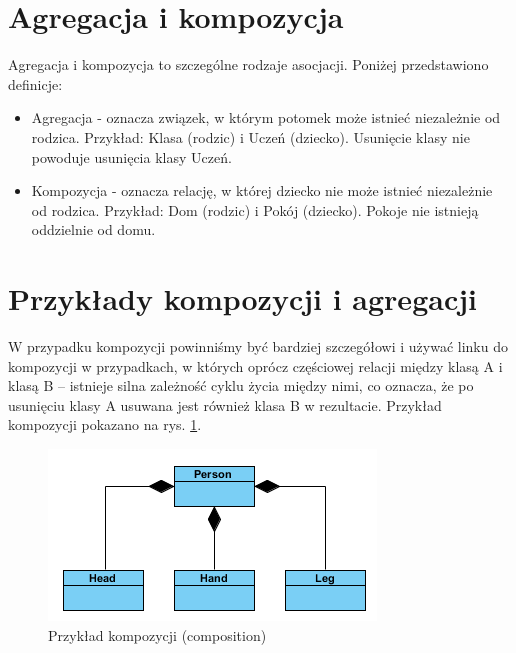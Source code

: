 \documentclass[a4paper,11pt]{report}
\begin{document}
\section{Agregacja i kompozycja}
Agregacja i kompozycja to szczególne rodzaje asocjacji. Poniżej przedstawiono definicje:
\begin{itemize}
	\item Agregacja - oznacza związek, w którym potomek może istnieć niezależnie od rodzica. 
		Przykład: Klasa (rodzic) i Uczeń (dziecko). Usunięcie klasy nie powoduje
		usunięcia klasy Uczeń.
		\item Kompozycja - oznacza relację, w której dziecko nie może istnieć 
			niezależnie od rodzica. Przykład: Dom (rodzic) i Pokój (dziecko). 
			Pokoje nie istnieją oddzielnie od domu.
\end{itemize}

\section{Przykłady kompozycji i agregacji}
W przypadku kompozycji powinniśmy być bardziej szczegółowi i używać linku 
do kompozycji w przypadkach, w których oprócz częściowej relacji między klasą A i 
klasą B – istnieje silna zależność cyklu życia między nimi, 
co oznacza, że po usunięciu klasy A usuwana jest również klasa B w rezultacie.
Przykład kompozycji pokazano na rys. \ref{fig:composition}.
\begin{figure}[H]
	\centering
	\includegraphics{figures/composition}
	\caption{Przykład kompozycji (composition) \cite{association}}
	\label{fig:composition}
\end{figure}
\end{document}
